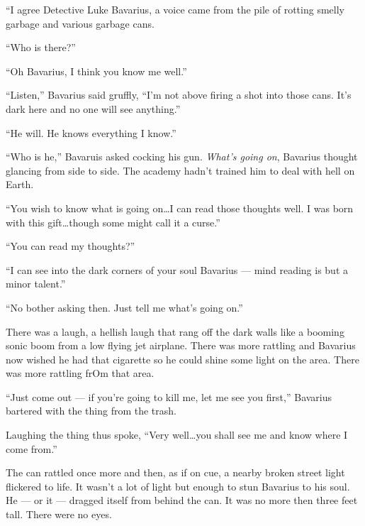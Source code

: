 ``I agree Detective Luke Bavarius, a voice came from the pile
of rotting smelly garbage and various garbage cans.



``Who is there?''



``Oh Bavarius, I think you know me well.''



``Listen,'' Bavarius said gruffly, ``I'm not above
firing a shot into those cans. It's dark here and no one will see
anything.''



``He will. He knows everything I know.''



``Who is he,'' Bavaruis asked cocking his gun. {\em What's
going on}, Bavarius thought glancing from side to side. The
academy hadn't trained him to deal with hell on Earth.



``You wish to know what is going on{\ldots}I can read those
thoughts well. I was born with this gift{\ldots}though some might call
it a curse.''



``You can read my thoughts?''



``I can see into the dark corners of your soul Bavarius
--- mind reading is but a minor talent.''



``No bother asking then. Just tell me what's going
on.''



There was a laugh, a hellish laugh that rang off the dark walls
like a booming sonic boom from a low flying jet airplane. There was
more rattling and Bavarius now wished he had that cigarette so he
could shine some light on the area. There was more rattling frOm
that area.



``Just come out --- if you're going to kill me, let me see
you first,'' Bavarius bartered with the thing from the
trash.



Laughing the thing thus spoke, ``Very well{\ldots}you shall see me
and know where I come from.''



The can rattled once more and then, as if on cue, a nearby broken
street light flickered to life. It wasn't a lot of light but enough
to stun Bavarius to his soul. He --- or it --- dragged
itself from behind the can. It was no more then three feet tall.
There were no eyes.



